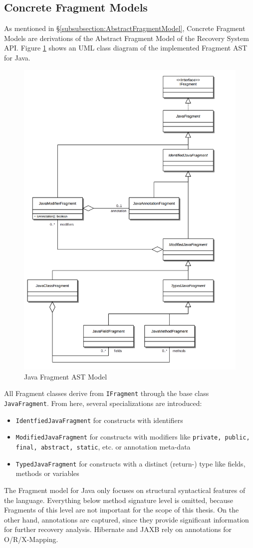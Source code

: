 \subsection{Concrete Fragment Models}
\label{subsection:ConcreteFragmentModels}
As mentioned in §\ref{subsubsection:AbstractFragmentModel}, Concrete \Gls{Fragment} Models are derivations of the Abstract Fragment Model of the Recovery System \gls{API}.
Figure \ref{figure:JavaFragmentASTModel} shows an \gls{UML} class diagram of the implemented \Gls{Fragment} \gls{AST} for \gls{Java}.
\begin{figure}[h!]
\begin{center}
\includegraphics[width=.7\textwidth]{images/JavaFragmentModel.png}
\end{center}
\caption{Java Fragment AST Model}
\label{figure:JavaFragmentASTModel}
\end{figure}
All \gls{Fragment} classes derive from \texttt{IFragment} through the base class \texttt{JavaFragment}.
From here, several specializations are introduced:
\begin{itemize}
\item
\texttt{IdentfiedJavaFragment} for constructs with identifiers
\item
\texttt{ModifiedJavaFragment} for constructs with modifiers like \texttt{private, public, final, abstract, static}, etc. or annotation meta-data
\item
\texttt{TypedJavaFragment} for constructs with a distinct (return-) type like fields, methods or variables
\end{itemize}
The \gls{Fragment} model for \gls{Java} only focuses on structural syntactical features of the language.
Everything below method signature level is omitted, because \glspl{Fragment} of this level are not important for the scope of this thesis.
On the other hand, annotations are captured, since they provide significant information for further recovery analysis.
\gls{Hibernate} and \gls{JAXB} rely on annotations for \gls{O/R/X-Mapping}.

